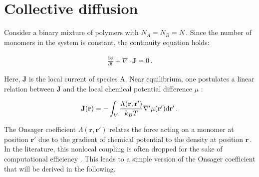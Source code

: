 \documentclass[bachelor,       %
               twoside,        %
               BCOR10mm,       %
                ngerman,english  %
               ]{GAUBM}
\begin{document}
\section{Collective diffusion}

Consider a binary mixture of polymers with $N_A=N_B=N\,$. Since the number of monomers in the system is constant, the continuity equation holds:

\begin{align}
  \frac{\partial\phi}{\partial t}+\nabla\cdot\mathbf{J}=0\,.
  \label{eq:conti}
\end{align}

Here, $\mathbf{J}$ is the local current of species A. Near equilibrium, one postulates a linear relation between $\mathbf J$ and the local chemical potential difference $\mu$ \cite{deGennes80}:


\begin{align}
    \mathbf J(\mathbf{r})=-\int_V\frac{\Lambda(\mathbf{r}, \mathbf{r'})}{k_BT}\nabla '\mu(\mathbf{r'})\text d \mathbf{r'}\,.
    \label{eq:current}
\end{align}

The Onsager coefficient $\Lambda(\mathbf{r}, \mathbf{r'})$ relates the force acting on a monomer at position $\mathbf{r'}$ due to the gradient of chemical potential to the density at position $\mathbf{r}\,$. In the literature, this nonlocal coupling is often dropped for the sake of computational efficiency \cite{Fraaje97,deGennes80,Binder83}. This leads to a simple version of the Onsager coefficient that will be derived in the following. 





\end{document}
